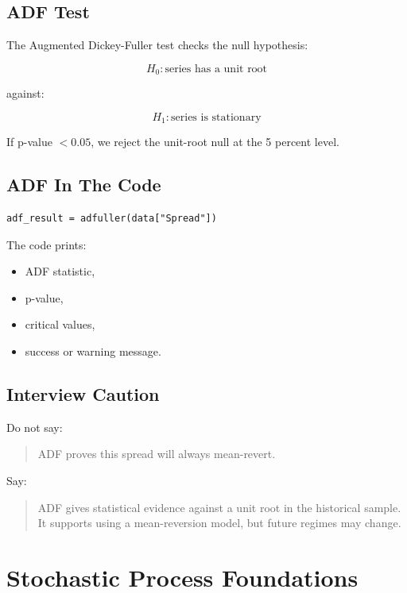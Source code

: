 \documentclass[11pt]{article}
\begin{document}
\subsection{ADF Test}

The Augmented Dickey-Fuller test checks the null hypothesis:

\[
H_0: \text{series has a unit root}
\]

against:

\[
H_1: \text{series is stationary}
\]

If p-value $< 0.05$, we reject the unit-root null at the 5 percent level.

\subsection{ADF In The Code}

\begin{lstlisting}[style=pythonstyle]
adf_result = adfuller(data["Spread"])
\end{lstlisting}

The code prints:

\begin{itemize}
  \item ADF statistic,
  \item p-value,
  \item critical values,
  \item success or warning message.
\end{itemize}

\subsection{Interview Caution}

Do not say:

\begin{quote}
ADF proves this spread will always mean-revert.
\end{quote}

Say:

\begin{quote}
ADF gives statistical evidence against a unit root in the historical sample.
It supports using a mean-reversion model, but future regimes may change.
\end{quote}

\section{Stochastic Process Foundations}
\end{document}
